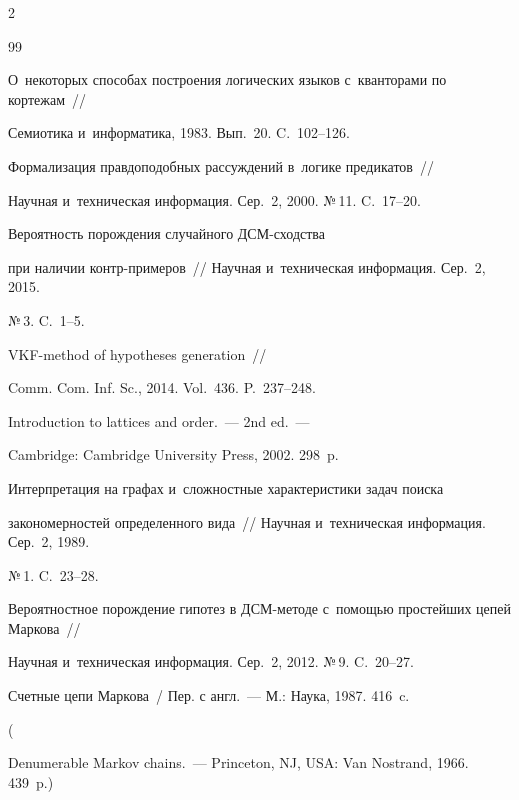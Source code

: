 \begin{multicols}{2}
{{\begin{thebibliography}{99}


О~некоторых способах построения логических языков с~кванторами по кортежам~// 

Се\-мио\-ти\-ка и~информатика, 1983. Вып.~20. C.~102--126.


 Формализация правдоподобных рассуждений в~логике предикатов~// 

Научная и~техническая информация. Сер.~2, 2000. №\,11. C.~17--20.


 Вероятность порождения случайного ДСМ-сход\-ст\-ва 

при наличии контр-при\-ме\-ров~// Научная и~техническая информация. Сер.~2, 2015.

 №\,3. C.~1--5.


 VKF-method of hypotheses generation~// 

Comm. Com. Inf. Sc., 2014. Vol.~436. P.~237--248.



Introduction to lattices and order.~--- 2nd ed.~--- 

Cambridge: Cambridge University Press, 2002. 298~p.



Интерпретация на графах и~сложностные характеристики задач поиска 

закономерностей определенного вида~// Научная и~техническая информация. Сер.~2, 1989. 

№\,1. C.~23--28.



Вероятностное порождение гипотез в ДСМ-ме\-то\-де с~по\-мощью простейших цепей Маркова~// 

Научная и~техническая информация. Сер.~2, 2012. №\,9. C.~20--27.



Счетные цепи Маркова~/ Пер. с англ.~--- М.: Наука, 1987. 416~c.

(

{Denumerable Markov chains}.~--- Princeton, NJ, USA: Van Nostrand,  1966. 439~p.)



 \end{thebibliography}



 }

 }



\end{multicols}




